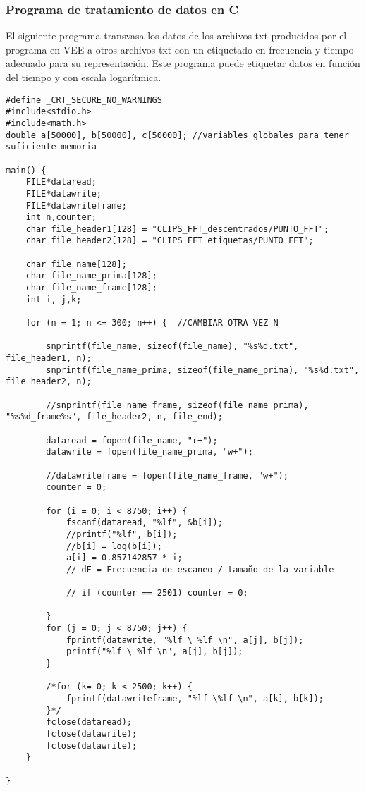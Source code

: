 \documentclass[journal, a4paper,onecolumn]{IEEEtran}
\begin{document}
\subsubsection{Programa de tratamiento de datos en C}

El siguiente programa transvasa los datos de los archivos txt producidos por el programa en VEE a otros archivos txt con un etiquetado en frecuencia y tiempo adecuado para su representación.
Este programa puede etiquetar datos en función del tiempo y con escala logarítmica.

\begin{lstlisting}
#define _CRT_SECURE_NO_WARNINGS
#include<stdio.h>
#include<math.h>
double a[50000], b[50000], c[50000]; //variables globales para tener suficiente memoria

main() {
	FILE*dataread;
	FILE*datawrite;
	FILE*datawriteframe;
	int n,counter;
	char file_header1[128] = "CLIPS_FFT_descentrados/PUNTO_FFT";
	char file_header2[128] = "CLIPS_FFT_etiquetas/PUNTO_FFT";
	
	char file_name[128];
	char file_name_prima[128];
	char file_name_frame[128];
	int i, j,k;

	for (n = 1; n <= 300; n++) {  //CAMBIAR OTRA VEZ N

		snprintf(file_name, sizeof(file_name), "%s%d.txt", file_header1, n);
		snprintf(file_name_prima, sizeof(file_name_prima), "%s%d.txt", file_header2, n);

		//snprintf(file_name_frame, sizeof(file_name_prima), "%s%d_frame%s", file_header2, n, file_end);

		dataread = fopen(file_name, "r+");
		datawrite = fopen(file_name_prima, "w+");

		//datawriteframe = fopen(file_name_frame, "w+");
		counter = 0;

		for (i = 0; i < 8750; i++) {
			fscanf(dataread, "%lf", &b[i]);
			//printf("%lf", b[i]);
			//b[i] = log(b[i]);
			a[i] = 0.857142857 * i; 
			// dF = Frecuencia de escaneo / tamaño de la variable 

			// if (counter == 2501) counter = 0;
			
		}
		for (j = 0; j < 8750; j++) {
			fprintf(datawrite, "%lf \ %lf \n", a[j], b[j]);
			printf("%lf \ %lf \n", a[j], b[j]);
		}

		/*for (k= 0; k < 2500; k++) {
			fprintf(datawriteframe, "%lf \%lf \n", a[k], b[k]);
		}*/
		fclose(dataread);
		fclose(datawrite);
		fclose(datawrite);
	}

}
\end{lstlisting}
\end{document}
